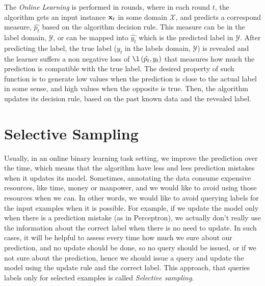 %


The \textit{Online Learning} is performed in rounds, where in each round $t$, 
the algorithm gets an input instance $\mathbf{x}_{t}$ in some domain $\mathcal{X}$, and predicts a  correspond 
measure, $\hat{p_t}$ based on the algorithm decision rule. This measure can be in the label domain, 
$\mathcal{Y}$, or can be mapped into $\hat{y_t}$ which is the predicted label in $\mathcal{Y}$.   
After predicting the label, the true label ($y_t$ in the labels domain, $\mathcal{Y}$)  is revealed 
and the learner suffers a non negative loss of $\l\paren{\hat{p_t},y_t}$ that measures how much the 
prediction is compatible with the true label. The desired property of such function is to generate low 
values when the prediction is close to the actual label in some sense, and high values when the opposite 
is true. Then, the algorithm updates its decision rule, based on the past known data and the revealed label. 

\section{Selective Sampling}
\label{sec:selective_sampling}

Usually, in an  online binary learning task setting,  we improve the prediction over the time, 
which means that the algorithm  have less and lees prediction mistakes when it updates its model. 
Sometimes, annotating the data consume expensive resources, like time, money or manpower, 
and we would like to avoid using those resources when we can. In other words, we would like 
to avoid querying labels for the input examples when it is possible. For example, if we  update the 
model only when there is a prediction mistake (as in Perceptron), we actually don't really 
use the information about the correct label when there is no need to update. In such cases, 
it will be helpful to assess every time how much we sure about our prediction, and no update should be done, 
so no query should be issued, or if we not sure about the prediction, hence we should issue a 
query and update the model using the update rule and the correct label. 
This approach, that queries labels only for selected examples is called \textit{Selective sampling.}

